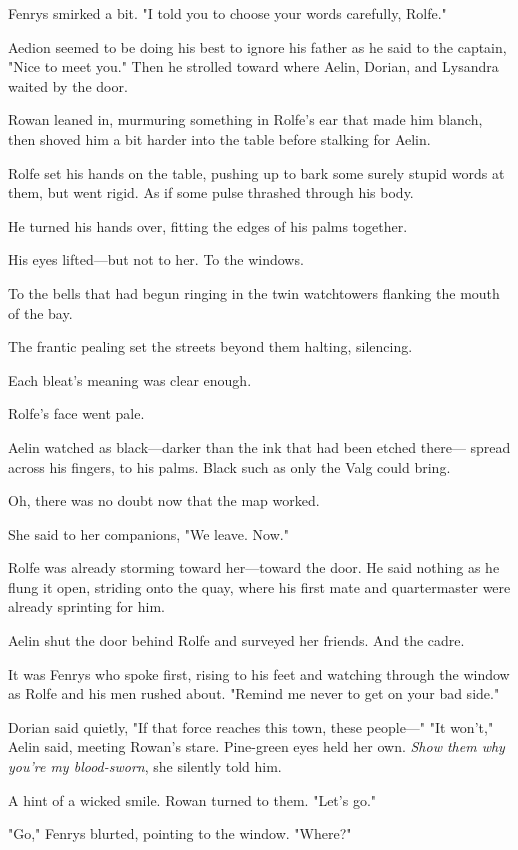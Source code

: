 Fenrys smirked a bit. "I told you to choose your words carefully, Rolfe."

Aedion seemed to be doing his best to ignore his father as he said to the captain, "Nice to meet you." Then he strolled toward where Aelin, Dorian, and Lysandra waited by the door.

Rowan leaned in, murmuring something in Rolfe's ear that made him blanch, then shoved him a bit harder into the table before stalking for Aelin.

Rolfe set his hands on the table, pushing up to bark some surely stupid words at them, but went rigid. As if some pulse thrashed through his body.

He turned his hands over, fitting the edges of his palms together.

His eyes lifted---but not to her. To the windows.

To the bells that had begun ringing in the twin watchtowers flanking the mouth of the bay.

The frantic pealing set the streets beyond them halting, silencing.

Each bleat's meaning was clear enough.

Rolfe's face went pale.

Aelin watched as black---darker than the ink that had been etched there--- spread across his fingers, to his palms. Black such as only the Valg could bring.

Oh, there was no doubt now that the map worked.

She said to her companions, "We leave. Now."

Rolfe was already storming toward her---toward the door. He said nothing as he flung it open, striding onto the quay, where his first mate and quartermaster were already sprinting for him.

Aelin shut the door behind Rolfe and surveyed her friends. And the cadre.

It was Fenrys who spoke first, rising to his feet and watching through the window as Rolfe and his men rushed about. "Remind me never to get on your bad side."

Dorian said quietly, "If that force reaches this town, these people---" "It won't," Aelin said, meeting Rowan's stare. Pine-green eyes held her own. \emph{Show them why you're my blood-sworn}, she silently told him.

A hint of a wicked smile. Rowan turned to them. "Let's go."

"Go," Fenrys blurted, pointing to the window. "Where?"

